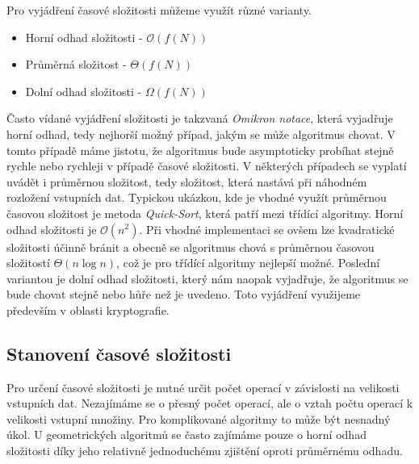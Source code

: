 	 Pro vyjádření časové složitosti můžeme využít různé varianty.
\begin{itemize}
	\item Horní odhad složitosti - $\mathcal{O} (f(N))$
	\item Průměrná složitost - $\Theta (f(N))$
	\item Dolní odhad složitosti - $\Omega (f(N))$
\end{itemize}	
	Často vídané vyjádření složitosti je takzvaná \textit{Omikron notace}, která vyjadřuje horní odhad, tedy nejhorší možný případ, jakým se může algoritmus chovat. V tomto případě máme jistotu, že algoritmus bude asymptoticky probíhat stejně rychle nebo rychleji v případě časové složitosti. V některých případech se vyplatí uvádět i průměrnou složitost, tedy složitost, která nastává při náhodném rozložení vstupních dat. Typickou ukázkou, kde je vhodné využít průměrnou časovou složitost je metoda \textit{Quick-Sort}, která patří mezi třídící algoritmy. Horní odhad složitosti je $\mathcal{O}(n^2)$. Při vhodné implementaci se ovšem lze kvadratické složitosti účinně bránit a obecně se algoritmus chová s průměrnou časovou složitostí $\Theta (n \log n)$, což je pro třídící algoritmy nejlepší možné.\cite{wirth1989algoritmy} Poslední variantou je dolní odhad složitosti, který nám naopak vyjadřuje, že algoritmus se bude chovat stejně nebo hůře než je uvedeno. Toto vyjádření využijeme především v oblasti kryptografie.\cite{milkova2010algoritmy} \cite{bayer2008algoritmy}
	
\subsection{Stanovení časové složitosti}
	Pro určení časové složitosti je nutné určit počet operací v závislosti na velikosti vstupních dat. Nezajímáme se o přesný počet operací, ale o vztah počtu operací k velikosti vstupní množiny. Pro komplikované algoritmy to může být nesnadný úkol. U geometrických algoritmů se často zajímáme pouze o horní odhad složitosti díky jeho relativně jednoduchému zjištění oproti průměrnému odhadu.
	
